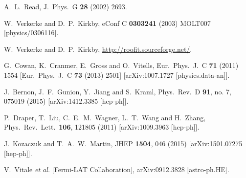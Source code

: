 \documentclass[preprintnumbers,superscriptaddress,nofootinbib,aps,prd,floatfix]{revtex4}
\begin{document}
\begin{thebibliography}{99}
  A.~L.~Read,
  J.\ Phys.\ G {\bf 28} (2002) 2693.


  W.~Verkerke and D.~P.~Kirkby,
  eConf C {\bf 0303241} (2003) MOLT007
  [physics/0306116].
  
  W.~Verkerke and D.~P.~Kirkby,
\url{http://roofit.sourceforge.net/}.
  
  G.~Cowan, K.~Cranmer, E.~Gross and O.~Vitells,
  Eur.\ Phys.\ J.\ C {\bf 71} (2011) 1554
   [Eur.\ Phys.\ J.\ C {\bf 73} (2013) 2501]
  [arXiv:1007.1727 [physics.data-an]].

  J.~Bernon, J.~F.~Gunion, Y.~Jiang and S.~Kraml,
  Phys.\ Rev.\ D {\bf 91}, no. 7, 075019 (2015)
  [arXiv:1412.3385 [hep-ph]].
 
  P.~Draper, T.~Liu, C.~E.~M.~Wagner, L.~T.~Wang and H.~Zhang,
  Phys.\ Rev.\ Lett.\  {\bf 106}, 121805 (2011)
  [arXiv:1009.3963 [hep-ph]].


  J.~Kozaczuk and T.~A.~W.~Martin,
  JHEP {\bf 1504}, 046 (2015)
  [arXiv:1501.07275 [hep-ph]].
 
  V.~Vitale {\it et al.} [Fermi-LAT Collaboration],
  arXiv:0912.3828 [astro-ph.HE].
 

\end{thebibliography}
\end{document}

